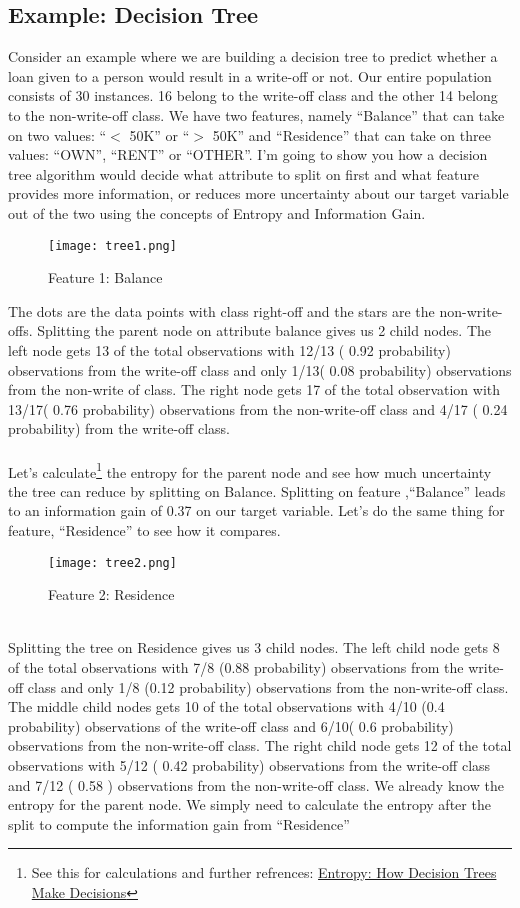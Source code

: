 \subsection*{Example: Decision Tree}
	Consider an example where we are building a decision tree to predict whether a loan given to a person would result in a write-off or not. Our entire population consists of 30 instances. 16 belong to the write-off class and the other 14 belong to the non-write-off class. We have two features, namely “Balance” that can take on two values: “$<$ 50K” or “$>$ 50K” and “Residence” that can take on three values: “OWN”, “RENT” or “OTHER”. I’m going to show you how a decision tree algorithm would decide what attribute to split on first and what feature provides more information, or reduces more uncertainty about our target variable out of the two using the concepts of Entropy and Information Gain.
	\begin{figure}[h]
		\centering
		\texttt{[image: tree1.png]}
		\caption{Feature 1: Balance}
	\end{figure}
	The dots are the data points with class right-off and the stars are the non-write-offs. Splitting the parent node on attribute balance gives us 2 child nodes. The left node gets 13 of the total observations with 12/13 ( 0.92 probability) observations from the write-off class and only 1/13( 0.08 probability) observations from the non-write of class. The right node gets 17 of the total observation with 13/17( 0.76 probability) observations from the non-write-off class and 4/17 ( 0.24 probability) from the write-off class.
	\\ \\Let’s calculate\footnote[1]{See this for calculations and further refrences: \href{https://towardsdatascience.com/entropy-how-decision-trees-make-decisions-2946b9c18c8}{Entropy: How Decision Trees Make Decisions}} the entropy for the parent node and see how much uncertainty the tree can reduce by splitting on Balance.	
	Splitting on feature ,“Balance” leads to an information gain of 0.37 on our target variable. Let’s do the same thing for feature, “Residence” to see how it compares.\\ 
	\begin{figure}[h]
		\centering
		\texttt{[image: tree2.png]}
		\caption{Feature 2: Residence}
	\end{figure}
	\\
	Splitting the tree on Residence gives us 3 child nodes. The left child node gets 8 of the total observations with 7/8 (0.88 probability) observations from the write-off class and only 1/8 (0.12 probability) observations from the non-write-off class. The middle child nodes gets 10 of the total observations with 4/10 (0.4 probability) observations of the write-off class and 6/10( 0.6 probability) observations from the non-write-off class. The right child node gets 12 of the total observations with 5/12 ( 0.42 probability) observations from the write-off class and 7/12 ( 0.58 ) observations from the non-write-off class. We already know the entropy for the parent node. We simply need to calculate the entropy after the split to compute the information gain from “Residence”

